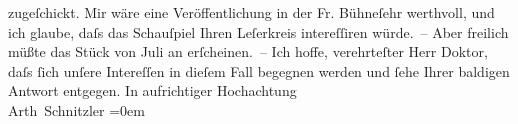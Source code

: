 \begin{ledgroupsized}[t]{13cm}
                    zugeſchickt.\pend
           \pstart
           Mir wäre eine Veröffentlichung in der Fr. Bühneſehr werthvoll, und ich glaube, daſs das
                    Schauſpiel Ihren Leſerkreis intereſſiren {\pb}würde. –
                    Aber freilich müßte das Stück von Juli an erſcheinen. –\pend
           \pstart
           Ich hoffe, verehrteſter Herr Doktor, daſs ſich unſere Intereſſen in dieſem Fall
                    begegnen werden und ſehe Ihrer baldigen Antwort entgegen.\pend
           \pstart
           In aufrichtiger Hochachtung{\\[\baselineskip]}\spacefill\mbox{Arth Schnitzler}\pend
           \leftskip=0em{}          \endnumbering{}\end{ledgroupsized}  \newcommand{\dateiname}{L00222}\newcommand{\titel}{Arthur Schnitzler an Wilhelm Bölsche, 14. 6. 1893}\newcommand{\editorInnen}{Martin Anton Müller und Gerd-Hermann Susen}
      